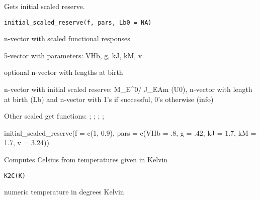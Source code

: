 \documentclass[a4paper]{book}
\begin{document}
%
\begin{Description}\relax
Gets initial scaled reserve.
\end{Description}
%
\begin{Usage}
\begin{verbatim}
initial_scaled_reserve(f, pars, Lb0 = NA)
\end{verbatim}
\end{Usage}
%
\begin{Arguments}
\begin{ldescription}
\item[\code{f}] n-vector with scaled functional responses

\item[\code{pars}] 5-vector with parameters: VHb, g, kJ, kM, v

\item[\code{Lb0}] optional n-vector with lengths at birth
\end{ldescription}
\end{Arguments}
%
\begin{Value}
n-vector with initial scaled reserve: M\_E\textasciicircum{}0/ J\_EAm (U0), n-vector with length at birth (Lb) and n-vector with 1's if successful, 0's otherwise (info)
\end{Value}
%
\begin{SeeAlso}\relax
Other scaled get functions: ;
; ;
; 
\end{SeeAlso}
%
\begin{Examples}
\begin{ExampleCode}
initial_scaled_reserve(f = c(1, 0.9), pars = c(VHb = .8, g = .42, kJ = 1.7, kM = 1.7, v = 3.24))
\end{ExampleCode}
\end{Examples}
%
\begin{Description}\relax
Computes Celsius from temperatures given in Kelvin
\end{Description}
%
\begin{Usage}
\begin{verbatim}
K2C(K)
\end{verbatim}
\end{Usage}
%
\begin{Arguments}
\begin{ldescription}
\item[\code{K}] numeric temperature in degrees Kelvin
\end{ldescription}
\end{Arguments}
\end{document}
